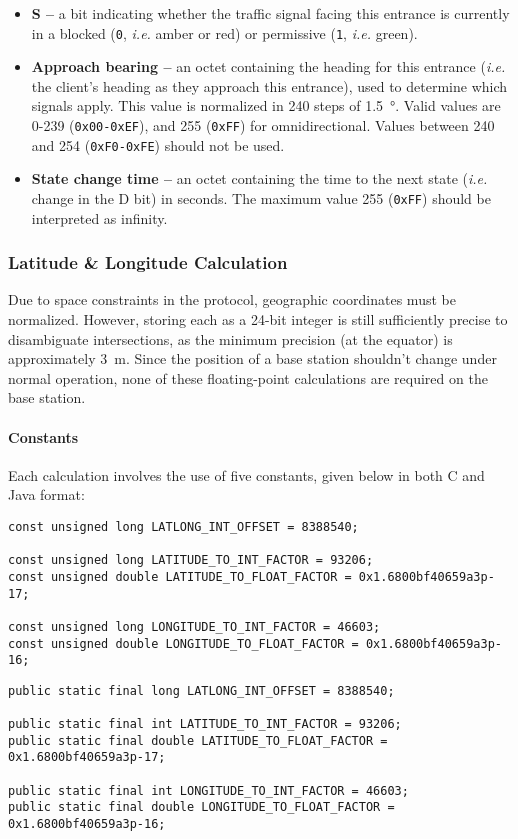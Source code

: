 \documentclass[12pt, oneside]{article}
\begin{document}
\begin{itemize}
\begin{itemize}
\item \textbf{S --} a bit indicating whether the traffic signal facing this entrance is currently in a blocked (\texttt{0}, \textit{i.e.} amber or red) or permissive (\texttt{1}, \textit{i.e.} green). 

\item \textbf{Approach bearing --} an octet containing the heading for this entrance (\textit{i.e.} the client's heading as they approach this entrance), used to determine which signals apply. This value is normalized in 240 steps of \SI{1.5}{\degree}. Valid values are 0-239 (\texttt{0x00-0xEF}), and 255 (\texttt{0xFF}) for omnidirectional. Values between 240 and 254 (\texttt{0xF0-0xFE}) should not be used.

\item \textbf{State change time --} an octet containing the time to the next state (\textit{i.e.} change in the D bit) in seconds. The maximum value 255 (\texttt{0xFF}) should be interpreted as infinity. 
\end{itemize}
\end{itemize}

\subsubsection{Latitude \& Longitude Calculation}\label{latlong}
Due to space constraints in the protocol, geographic coordinates must be normalized. However, storing each as a 24-bit integer is still sufficiently precise to disambiguate intersections, as the minimum precision (at the equator) is approximately \SI{3}{\metre}. Since the position of a base station shouldn't change under normal operation, none of these floating-point calculations are required on the base station.

\paragraph{Constants} Each calculation involves the use of five constants, given below in both C and Java format:
\begin{verbatim}
const unsigned long LATLONG_INT_OFFSET = 8388540;

const unsigned long LATITUDE_TO_INT_FACTOR = 93206;
const unsigned double LATITUDE_TO_FLOAT_FACTOR = 0x1.6800bf40659a3p-17;

const unsigned long LONGITUDE_TO_INT_FACTOR = 46603;
const unsigned double LONGITUDE_TO_FLOAT_FACTOR = 0x1.6800bf40659a3p-16;
\end{verbatim}
\begin{verbatim}
public static final long LATLONG_INT_OFFSET = 8388540;

public static final int LATITUDE_TO_INT_FACTOR = 93206;
public static final double LATITUDE_TO_FLOAT_FACTOR = 0x1.6800bf40659a3p-17;

public static final int LONGITUDE_TO_INT_FACTOR = 46603;
public static final double LONGITUDE_TO_FLOAT_FACTOR = 0x1.6800bf40659a3p-16;
\end{verbatim}
\end{document}
